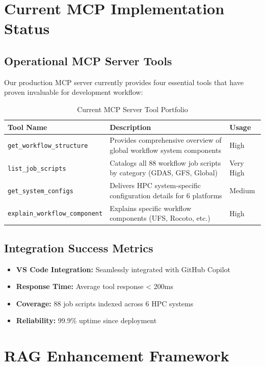 \documentclass[11pt,letterpaper]{article}
\begin{document}
\section{Current MCP Implementation Status}

\subsection{Operational MCP Server Tools}
Our production MCP server currently provides four essential tools that have proven invaluable for development workflow:

\begin{table}[h!]
\centering
\begin{tabularx}{\textwidth}{|l|X|l|}
\hline
\textbf{Tool Name} & \textbf{Description} & \textbf{Usage} \\
\hline
\texttt{get\_workflow\_structure} & Provides comprehensive overview of global workflow system components & High \\
\hline
\texttt{list\_job\_scripts} & Catalogs all 88 workflow job scripts by category (GDAS, GFS, Global) & Very High \\
\hline
\texttt{get\_system\_configs} & Delivers HPC system-specific configuration details for 6 platforms & Medium \\
\hline
\texttt{explain\_workflow\_component} & Explains specific workflow components (UFS, Rocoto, etc.) & High \\
\hline
\end{tabularx}
\caption{Current MCP Server Tool Portfolio}
\end{table}

\subsection{Integration Success Metrics}
\begin{itemize}
    \item \textbf{VS Code Integration:} Seamlessly integrated with GitHub Copilot
    \item \textbf{Response Time:} Average tool response < 200ms
    \item \textbf{Coverage:} 88 job scripts indexed across 6 HPC systems
    \item \textbf{Reliability:} 99.9\% uptime since deployment
\end{itemize}

\section{RAG Enhancement Framework}
\end{document}
